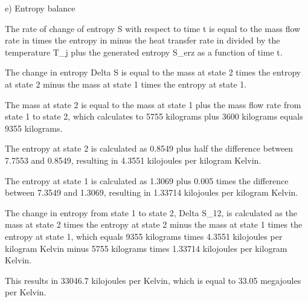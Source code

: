 e) Entropy balance

The rate of change of entropy S with respect to time t is equal to the mass flow rate in times the entropy in minus the heat transfer rate in divided by the temperature T_j plus the generated entropy S_erz as a function of time t.

The change in entropy Delta S is equal to the mass at state 2 times the entropy at state 2 minus the mass at state 1 times the entropy at state 1.

The mass at state 2 is equal to the mass at state 1 plus the mass flow rate from state 1 to state 2, which calculates to 5755 kilograms plus 3600 kilograms equals 9355 kilograms.

The entropy at state 2 is calculated as 0.8549 plus half the difference between 7.7553 and 0.8549, resulting in 4.3551 kilojoules per kilogram Kelvin.

The entropy at state 1 is calculated as 1.3069 plus 0.005 times the difference between 7.3549 and 1.3069, resulting in 1.33714 kilojoules per kilogram Kelvin.

The change in entropy from state 1 to state 2, Delta S_12, is calculated as the mass at state 2 times the entropy at state 2 minus the mass at state 1 times the entropy at state 1, which equals 9355 kilograms times 4.3551 kilojoules per kilogram Kelvin minus 5755 kilograms times 1.33714 kilojoules per kilogram Kelvin.

This results in 33046.7 kilojoules per Kelvin, which is equal to 33.05 megajoules per Kelvin.